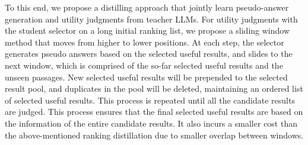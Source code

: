 To this end, we propose a distilling approach that 
jointly learn pseudo-answer generation and utility judgments from teacher LLMs. 
For utility judgments with the student selector on a long initial ranking list, we propose a sliding window method that moves from higher to lower positions. At each step, the selector generates pseudo answers based on the selected useful results, and slides to the next window, which is comprised of the so-far selected useful results and the unseen passages. New selected useful results will be prepended to the selected result pool, and duplicates in the pool will be deleted, maintaining an ordered list of selected useful results. This process is repeated until all the candidate results are judged. 
This process ensures that the final selected useful results are based on the information of the entire candidate results. It also incurs a smaller cost than the above-mentioned ranking distillation due to smaller overlap between windows. 


